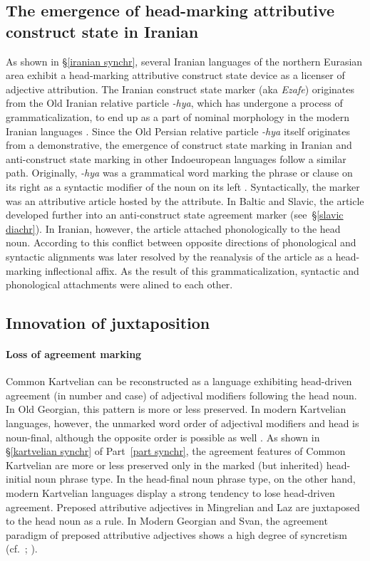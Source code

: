 {\subsection[Head-marking attributive construct state]{The emergence of head-marking attributive construct state in Iranian}\label{iranian diachr}
As shown in \S\ref{iranian synchr}, several Iranian languages of the northern Eurasian area exhibit a head-marking attributive construct state device as a licenser of adjective attribution. The Iranian construct state marker (aka \textit{Ezafe}) originates from the Old Iranian relative particle \textit{-hya}, which has undergone a process of grammaticalization, to end up as a part of nominal morphology in the modern Iranian languages \citep{haider-etal1984,samvelian2007b}. Since the Old Persian relative particle \textit{-hya} itself originates from a demonstrative, the emergence of construct state marking in Iranian and anti-construct state marking in other Indoeuropean languages follow a similar path. Originally, \textit{-hya} was a grammatical word marking the phrase or clause on its right as a syntactic modifier of the noun on its left \citep{haider-etal1984}. Syntactically, the marker was an attributive article hosted by the attribute. In Baltic and Slavic, the article developed further into an anti-construct state agreement marker (see~\S\ref{slavic diachr}). In Iranian, however, the article attached phonologically to the head noun. According to \citet[3]{samvelian2007} this conflict between opposite directions of phonological and syntactic alignments was later resolved by the reanalysis of the article as a head-marking inflectional affix. As the result of this grammaticalization, syntactic and phonological attachments were alined to each other.

\subsection[Innovation of juxtaposition]{Innovation of juxtaposition}
\paragraph{Loss of agreement marking}
Common Kartvelian can be reconstructed as a language exhibiting head-driven agreement (in number and case) of adjectival modifiers following the head noun. In Old Georgian, this pattern is more or less preserved. In modern Kartvelian languages, however, the unmarked word order of adjectival modifiers and head is noun-final, although the opposite order is possible as well \cite[56]{harris1991a}. As shown in \S\ref{kartvelian synchr} of Part~\ref{part synchr}, the agreement features of Common Kartvelian are more or less preserved only in the marked (but inherited) head-initial noun phrase type. In the head-final noun phrase type, on the other hand, modern Kartvelian languages display a strong tendency to lose head-driven agreement. Preposed attributive adjectives in Mingrelian and Laz are juxtaposed to the head noun as a rule. In Modern Georgian and Svan, the agreement paradigm of preposed attributive adjectives shows a high degree of syncretism (cf.~\citealt[56]{harris1991a}; \citealt[56–60, elsewhere]{tuite1998}).

}
